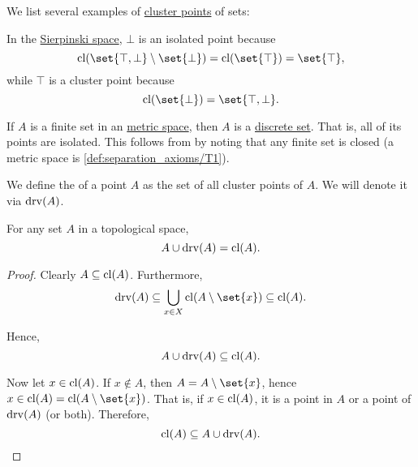 \begin{example}\label{ex:def:set_cluster_point}
  We list several examples of \hyperref[def:set_cluster_point]{cluster points} of sets:
  \begin{thmenum}
     In the \hyperref[def:sierpinski_space]{Sierpinski space}, \( \bot \) is an isolated point because
    \begin{equation*}
      \cl(\set{ \top, \bot } \setminus \set{ \bot }) = \cl(\set{ \top }) = \set{ \top },
    \end{equation*}
    while \( \top \) is a cluster point because
    \begin{equation*}
      \cl(\set{ \bot }) = \set{ \top, \bot }.
    \end{equation*}

     If \( A \) is a finite set in an \hyperref[def:metric_space]{metric space}, then \( A \) is a \hyperref[thm:def:set_cluster_point/discrete]{discrete set}. That is, all of its points are isolated. This follows from  by noting that any finite set is closed (a metric space is \ref{def:separation_axioms/T1}).
  \end{thmenum}
\end{example}

\begin{definition}\label{def:derived_set}
  We define the  of a point \( A \) as the set of all cluster points of \( A \). We will denote it via \( \operatorname{drv}(A) \).
\end{definition}

\begin{proposition}\label{thm:union_with_derived_set}
  For any set \( A \) in a topological space,
  \begin{equation*}
    A \cup \operatorname{drv}(A) = \operatorname{cl}(A).
  \end{equation*}
\end{proposition}
\begin{proof}
  Clearly \( A \subseteq \operatorname{cl}(A) \). Furthermore,
  \begin{equation*}
    \drv(A) \subseteq \bigcup_{x \in X} \cl(A \setminus \set{ x }) \subseteq \cl(A).
  \end{equation*}

  Hence,
  \begin{equation*}
    A \cup \operatorname{drv}(A) \subseteq \operatorname{cl}(A).
  \end{equation*}

  Now let \( x \in \operatorname{cl}(A) \). If \( x \not\in A \), then \( A = A \setminus \set{ x } \), hence \( x \in \cl(A) = \cl(A \setminus \set{ x }) \). That is, if \( x \in \operatorname{cl}(A) \), it is a point in \( A \) or a point of \( \operatorname{drv}(A) \) (or both). Therefore,
  \begin{equation*}
    \operatorname{cl}(A) \subseteq A \cup \operatorname{drv}(A).
  \end{equation*}
\end{proof}

